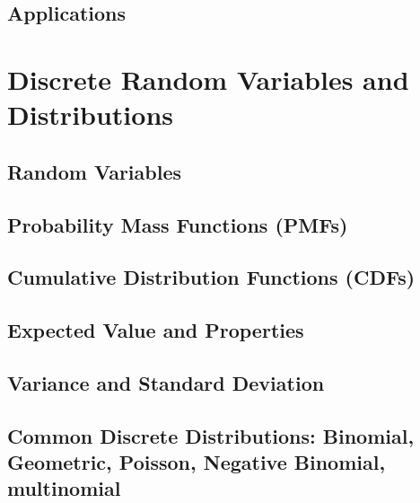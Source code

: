 \documentclass[
  12pt,
]{krantzNoCorner}
\begin{document}
\hypertarget{applications}{%
\section{Applications}\label{applications}}

\hypertarget{discrete-random-variables-and-distributions}{%
\chapter{Discrete Random Variables and Distributions}\label{discrete-random-variables-and-distributions}}

\hypertarget{random-variables}{%
\section{Random Variables}\label{random-variables}}

\hypertarget{probability-mass-functions-pmfs}{%
\section{Probability Mass Functions (PMFs)}\label{probability-mass-functions-pmfs}}

\hypertarget{cumulative-distribution-functions-cdfs}{%
\section{Cumulative Distribution Functions (CDFs)}\label{cumulative-distribution-functions-cdfs}}

\hypertarget{expected-value-and-properties}{%
\section{Expected Value and Properties}\label{expected-value-and-properties}}

\hypertarget{variance-and-standard-deviation}{%
\section{Variance and Standard Deviation}\label{variance-and-standard-deviation}}

\hypertarget{common-discrete-distributions-binomial-geometric-poisson-negative-binomial-multinomial}{%
\section{Common Discrete Distributions: Binomial, Geometric, Poisson, Negative Binomial, multinomial}\label{common-discrete-distributions-binomial-geometric-poisson-negative-binomial-multinomial}}
\end{document}
